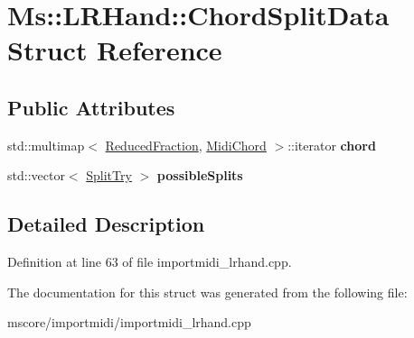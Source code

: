 \hypertarget{struct_ms_1_1_l_r_hand_1_1_chord_split_data}{}\section{Ms\+:\+:L\+R\+Hand\+:\+:Chord\+Split\+Data Struct Reference}
\label{struct_ms_1_1_l_r_hand_1_1_chord_split_data}
\subsection*{Public Attributes}
\begin{DoxyCompactItemize}
\item 
\mbox{\label{struct_ms_1_1_l_r_hand_1_1_chord_split_data_abec8e35c1c368eb63ad0f15727690747}} 
std\+::multimap$<$ \hyperlink{class_ms_1_1_reduced_fraction}{Reduced\+Fraction}, \hyperlink{class_ms_1_1_midi_chord}{Midi\+Chord} $>$\+::iterator {\bfseries chord}
\item 
\mbox{\label{struct_ms_1_1_l_r_hand_1_1_chord_split_data_ab932e4d6a5a94018bae9f487899df80f}} 
std\+::vector$<$ \hyperlink{struct_ms_1_1_l_r_hand_1_1_split_try}{Split\+Try} $>$ {\bfseries possible\+Splits}
\end{DoxyCompactItemize}


\subsection{Detailed Description}


Definition at line 63 of file importmidi\+\_\+lrhand.\+cpp.



The documentation for this struct was generated from the following file\+:\begin{DoxyCompactItemize}
\item 
mscore/importmidi/importmidi\+\_\+lrhand.\+cpp\end{DoxyCompactItemize}
